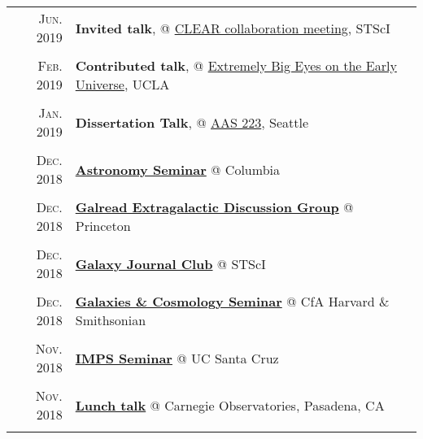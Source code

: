 \documentclass[letterpaper,12pt]{article}
\newcommand{\textwrap}{5.3in}       %
\begin{document}
\begin{longtable}{r|p{\textwrap}}
    \textsc{Jun. 2019}   &   \textbf{Invited talk}, @ \href{https://sites.google.com/view/clearhst19/home}{CLEAR collaboration meeting}, STScI \\
    \multicolumn{2}{c}{} \\

    \textsc{Feb. 2019}   &   \textbf{Contributed talk}, @ \href{https://conferences.pa.ucla.edu/early-universe-2019/agenda.html}{Extremely Big Eyes on the Early Universe}, UCLA  \\
    \multicolumn{2}{c}{} \\

    \textsc{Jan. 2019}   &   \textbf{Dissertation Talk}, @ \href{https://aas.org/meetings/aas233}{AAS 223}, Seattle    \\
    \multicolumn{2}{c}{} \\

    \textsc{Dec. 2018}   &   \href{http://www.astro.columbia.edu/event?eid=584}{\textbf{Astronomy Seminar}} @ Columbia \\
    \multicolumn{2}{c}{} \\

    \textsc{Dec. 2018}   &   \href{https://web.astro.princeton.edu/node/9886}{\textbf{Galread Extragalactic Discussion Group}} @ Princeton \\
    \multicolumn{2}{c}{} \\

    \textsc{Dec. 2018}   &   \href{https://sites.google.com/site/stscigalaxyclub/}{\textbf{Galaxy Journal Club}} @ STScI \\
    \multicolumn{2}{c}{} \\

    \textsc{Dec. 2018}   &   \href{https://www.cfa.harvard.edu/events/galaxies-cosmology-seminar?field_seminar_series_value=fall18}{\textbf{Galaxies \& Cosmology Seminar}} @ CfA Harvard \& Smithsonian \\
    \multicolumn{2}{c}{} \\

    \textsc{Nov. 2018}   &   \href{https://docs.google.com/document/d/1fhFuTsbHO7ATeQEiBvRQ4fj_BDR7pM4HPMjxeMyEyh4/edit}{\textbf{IMPS Seminar}} @ UC Santa Cruz \\
    \multicolumn{2}{c}{} \\

    \textsc{Nov. 2018}   &   \href{https://obs.carnegiescience.edu/content/tbd-108}{\textbf{Lunch talk}} @ Carnegie Observatories, Pasadena, CA \\
    \multicolumn{2}{c}{} \\


\end{longtable}
\end{document}
